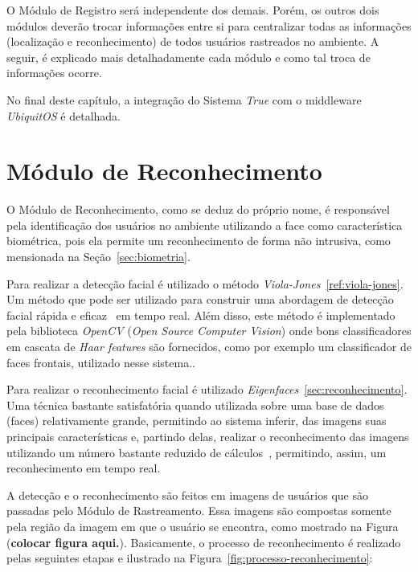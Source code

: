 O Módulo de Registro será independente dos demais. Porém, os outros dois módulos deverão trocar informações entre si para centralizar todas as informações (localização e reconhecimento) de todos usuários rastreados no ambiente. A seguir, é explicado mais detalhadamente cada módulo e como tal troca de informações ocorre.

No final deste capítulo, a integração do Sistema \textit{True} com o middleware \textit{UbiquitOS} é detalhada.

\section{Módulo de Reconhecimento}

	O Módulo de Reconhecimento, como se deduz do próprio nome, é responsável pela identificação dos usuários no ambiente utilizando a face como característica biométrica, pois ela permite um reconhecimento de forma não intrusiva, como mensionada na Seção~\ref{sec:biometria}. 

	Para realizar a detecção facial é utilizado o método \textit{Viola-Jones}~\ref{ref:viola-jones}. Um método que pode ser utilizado para construir uma abordagem de detecção facial rápida e eficaz~\cite{violajones} em tempo real. Além disso, este método é implementado pela biblioteca \textit{OpenCV} (\textit{Open Source Computer Vision}) onde bons classificadores em cascata de \textit{Haar features} são fornecidos, como por exemplo um classificador de faces frontais, utilizado nesse sistema..

	Para realizar o reconhecimento facial é utilizado \textit{Eigenfaces}~\ref{sec:reconhecimento}. Uma técnica bastante satisfatória quando utilizada sobre uma base de dados (faces) relativamente grande, permitindo ao sistema inferir, das imagens suas principais características e, partindo delas, realizar o reconhecimento das imagens utilizando um número bastante reduzido de cálculos~\cite{artigo-eigenface}, permitindo, assim, um reconhecimento em tempo real.

	A detecção e o reconhecimento são feitos em imagens de usuários que são passadas pelo Módulo de Rastreamento. Essa imagens são compostas somente pela região da imagem em que o usuário se encontra, como mostrado na Figura (\textbf{colocar figura aqui.}). Basicamente, o processo de reconhecimento é realizado pelas seguintes etapas e ilustrado na Figura~\ref{fig:processo-reconhecimento}:

